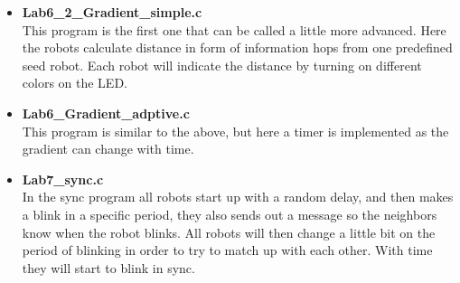 \begin{itemize}
\item \textbf{Lab6\_2\_Gradient\_simple.c}\\
This program is the first one that can be called a little more advanced. Here the robots calculate distance in form of information hops from one predefined seed robot. Each robot will indicate the distance by turning on different colors on the LED.

\item \textbf{Lab6\_Gradient\_adptive.c}\\
This program is similar to the above, but here a timer is implemented as the gradient can change with time.

\item \textbf{Lab7\_sync.c}\\
In the sync program all robots start up with a random delay, and then makes a blink in a specific period, they also sends out a message so the neighbors know when the robot blinks. All robots will then change a little bit on the period of blinking in order to try to match up with each other. With time they will start to blink in sync.
\end{itemize}

